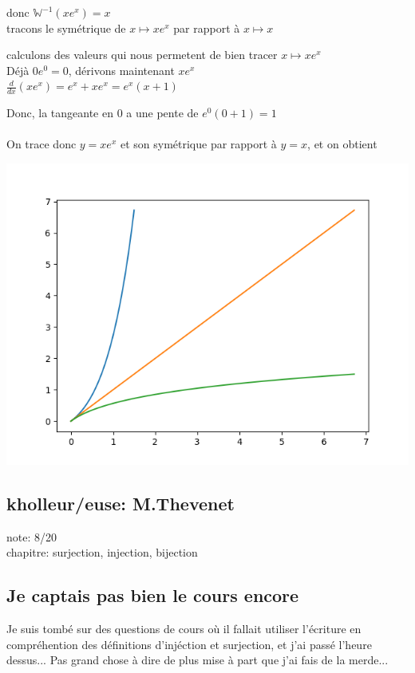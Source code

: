 \documentclass{article}
\begin{document}
donc $\mathbb{W}^{-1} (xe^x) = x$ \\
tracons le symétrique de $x \mapsto xe^x$ par rapport à $x \mapsto x$

calculons des valeurs qui nous permetent de bien tracer $x \mapsto xe^x$ \\
Déjà $ 0e^0 = 0$, dérivons maintenant $xe^x$ \\
$\frac{d}{dx}(xe^x) = e^x + xe^x = e^x (x+1)$

Donc, la tangeante en 0 a une pente de $e^0(0+1) = 1$ \\ \\

On trace donc $y = xe^x$ et son symétrique par rapport à $y=x$, et on obtient

\includegraphics[scale=0.5]{graph-kholle-W.png}

\subsection{kholleur/euse: M.Thevenet}

note: 8/20 \\
chapitre: surjection, injection, bijection

\subsection{Je captais pas bien le cours encore}

Je suis tombé sur des questions de cours où il fallait utiliser l'écriture en compréhention des définitions d'injéction et surjection, et j'ai passé l'heure dessus... Pas grand chose à dire de plus mise à part que j'ai fais de la merde... \\
\end{document}
